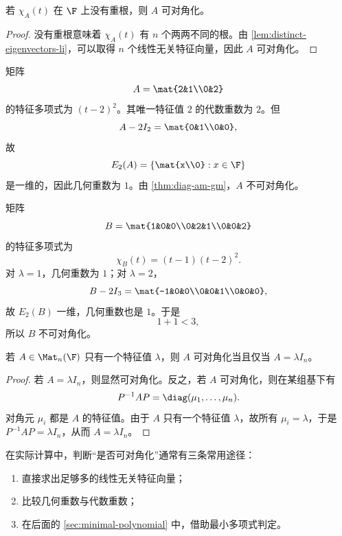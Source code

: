\begin{corollary}
若 \(\chi_A(t)\) 在 \(\F\) 上没有重根，则 \(A\) 可对角化。
\end{corollary}

\begin{proof}
没有重根意味着 \(\chi_A(t)\) 有 \(n\) 个两两不同的根。由 \cref{lem:distinct-eigenvectors-li}，可以取得 \(n\) 个线性无关特征向量，因此 \(A\) 可对角化。
\end{proof}

\begin{example}
矩阵
\[
A=\mat{2&1\\0&2}
\]
的特征多项式为 \((t-2)^2\)。其唯一特征值 \(2\) 的代数重数为 \(2\)。但
\[
A-2I_2=\mat{0&1\\0&0},
\]
故
\[
E_2(A)=\left\{\mat{x\\0}:x\in \F\right\}
\]
是一维的，因此几何重数为 \(1\)。由 \cref{thm:diag-am-gm}，\(A\) 不可对角化。
\end{example}

\begin{example}
矩阵
\[
B=\mat{1&0&0\\0&2&1\\0&0&2}
\]
的特征多项式为
\[
\chi_B(t)=(t-1)(t-2)^2.
\]
对 \(\lambda=1\)，几何重数为 \(1\)；对 \(\lambda=2\)，
\[
B-2I_3=\mat{-1&0&0\\0&0&1\\0&0&0},
\]
故 \(E_2(B)\) 一维，几何重数也是 \(1\)。于是
\[
1+1<3,
\]
所以 \(B\) 不可对角化。
\end{example}

\begin{proposition}
若 \(A\in \Mat_n(\F)\) 只有一个特征值 \(\lambda\)，则 \(A\) 可对角化当且仅当 \(A=\lambda I_n\)。
\end{proposition}

\begin{proof}
若 \(A=\lambda I_n\)，则显然可对角化。反之，若 \(A\) 可对角化，则在某组基下有
\[
P^{-1}AP=\diag(\mu_1,\dots,\mu_n).
\]
对角元 \(\mu_i\) 都是 \(A\) 的特征值。由于 \(A\) 只有一个特征值 \(\lambda\)，故所有 \(\mu_i=\lambda\)，于是 \(P^{-1}AP=\lambda I_n\)，从而 \(A=\lambda I_n\)。
\end{proof}

\begin{remark}
在实际计算中，判断“是否可对角化”通常有三条常用途径：
\begin{enumerate}[label=(\arabic*), leftmargin=2.4em]
  \item 直接求出足够多的线性无关特征向量；
  \item 比较几何重数与代数重数；
  \item 在后面的 \cref{sec:minimal-polynomial} 中，借助最小多项式判定。
\end{enumerate}
\end{remark}

